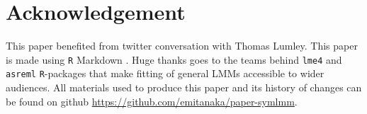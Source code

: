 \documentclass[runningheads]{llncs}\usepackage[]{graphicx}\usepackage[]{color}
\begin{document}
\section*{Acknowledgement}

This paper benefited from twitter conversation with Thomas Lumley. This paper is made using \texttt{R} Markdown \citep{rmarkdown}. Huge thanks goes to the teams behind \texttt{lme4} and \texttt{asreml} \texttt{R}-packages that make fitting of general LMMs accessible to wider audiences. All materials used to produce this paper and its history of changes can be found on github \url{https://github.com/emitanaka/paper-symlmm}.








\end{document}

